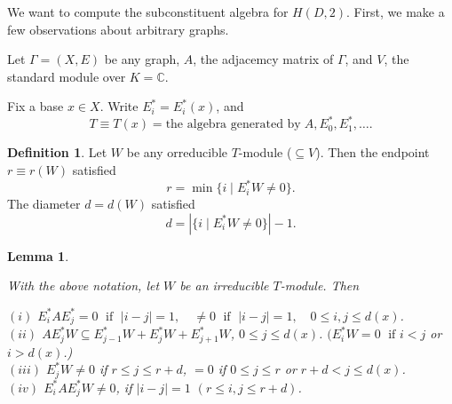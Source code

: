 \documentclass[
]{book}
\newtheorem{lemma}{Lemma}[chapter]
\theoremstyle{definition}
\newtheorem{definition}{Definition}[chapter]
\theoremstyle{definition}
\theoremstyle{definition}
\theoremstyle{definition}
\theoremstyle{remark}
\begin{document}
We want to compute the subconstituent algebra for \(H(D,2)\). First, we make a few observations about arbitrary graphs.

Let \(\Gamma = (X,E)\) be any graph, \(A\), the adjacemcy matrix of \(\Gamma\), and \(V\), the standard module over \(K = \mathbb{C}\).

Fix a base \(x\in X\). Write \(E_i^* = E_i^*(x)\), and
\[T \equiv T(x) = \text{the algebra generated by}\; A, E_0^*, E_1^*, \ldots .\]

\begin{definition}
Let \(W\) be any orreducible \(T\)-module (\(\subseteq V\)). Then the endpoint \(r \equiv r(W)\) satisfied
\[r = \min\{i\mid E_i^*W \neq 0\}.\]
The diameter \(d = d(W)\) satisfied
\[d = |\{i\mid E_i^*W \neq 0\}| - 1.\]
\end{definition}

\begin{lemma}
\protect\hypertarget{lem:irreducible}{}\label{lem:irreducible}

With the above notation, let \(W\) be an irreducible \(T\)-module. Then

\((i)\) \(E_i^*AE_j^* = 0 \; \text{ if }\; |i-j|=1, \quad \neq 0 \; \text{ if }\; |i-j| = 1, \quad 0\leq i,j\leq d(x)\).\\
\((ii)\) \(AE_j^*W \subseteq E_{j-1}^*W + E_j^*W + E^*_{j+1}W\), \(0\leq j \leq d(x)\). \((E_i^*W = 0 \; \text{ if } i<j\) or \(i > d(x)\).)\\
\((iii)\) \(E^*_jW \neq 0\) if \(r\leq j \leq r+d\), \(=0\) if \(0\leq j\leq r\) or \(r+d < j \leq d(x)\).\\
\((iv)\) \(E_i^*AE^*_jW \neq 0\), if \(|i-j| = 1\) \((r \leq i,j \leq r+d)\).

\end{lemma}
\end{document}
